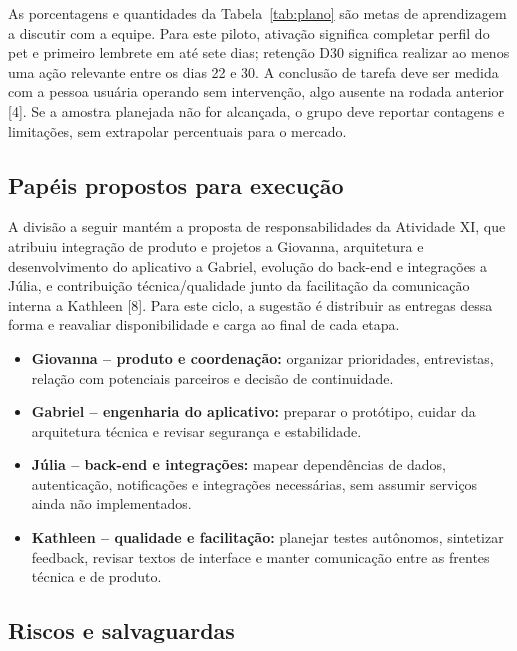 \documentclass[12pt,a4paper]{article}
\begin{document}
As porcentagens e quantidades da Tabela~\ref{tab:plano} são metas de aprendizagem a discutir com a equipe. Para este piloto, ativação significa completar perfil do pet e primeiro lembrete em até sete dias; retenção D30 significa realizar ao menos uma ação relevante entre os dias 22 e 30. A conclusão de tarefa deve ser medida com a pessoa usuária operando sem intervenção, algo ausente na rodada anterior [4]. Se a amostra planejada não for alcançada, o grupo deve reportar contagens e limitações, sem extrapolar percentuais para o mercado.

\subsection{Papéis propostos para execução}

A divisão a seguir mantém a proposta de responsabilidades da Atividade XI, que atribuiu integração de produto e projetos a Giovanna, arquitetura e desenvolvimento do aplicativo a Gabriel, evolução do back-end e integrações a Júlia, e contribuição técnica/qualidade junto da facilitação da comunicação interna a Kathleen [8]. Para este ciclo, a sugestão é distribuir as entregas dessa forma e reavaliar disponibilidade e carga ao final de cada etapa.

\begin{itemize}
\item \textbf{Giovanna -- produto e coordenação:} organizar prioridades, entrevistas, relação com potenciais parceiros e decisão de continuidade.
\item \textbf{Gabriel -- engenharia do aplicativo:} preparar o protótipo, cuidar da arquitetura técnica e revisar segurança e estabilidade.
\item \textbf{Júlia -- back-end e integrações:} mapear dependências de dados, autenticação, notificações e integrações necessárias, sem assumir serviços ainda não implementados.
\item \textbf{Kathleen -- qualidade e facilitação:} planejar testes autônomos, sintetizar feedback, revisar textos de interface e manter comunicação entre as frentes técnica e de produto.
\end{itemize}

\subsection{Riscos e salvaguardas}
\end{document}
